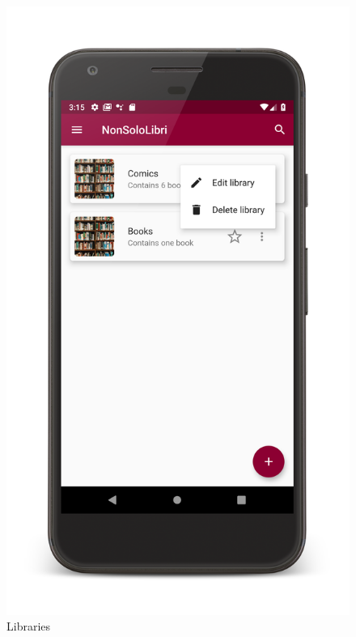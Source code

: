 \begin{figure}[!htb]
\begin{minipage}[b]{0.3\textwidth}
        \label{ref:loginpage}
    \end{minipage}
    \hfill
    \begin{minipage}[b]{0.3\textwidth}
        \includegraphics[scale=0.09]{images/libraries-page.png}
        \caption{Libraries}
        \label{ref:librariespage}
    \end{minipage}
    \hfill
    \begin{minipage}[b]{0.3\textwidth}

\end{minipage}
\end{figure}

